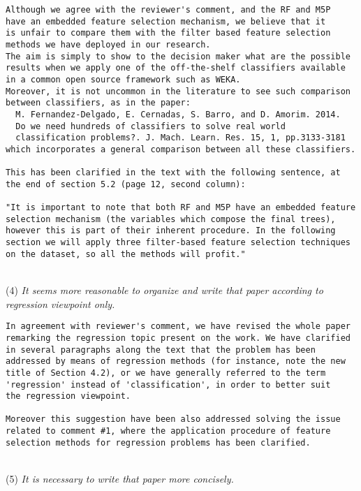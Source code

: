 \documentclass[preprint]{elsarticle}
\begin{document}
\begin{verbatim}
Although we agree with the reviewer's comment, and the RF and M5P 
have an embedded feature selection mechanism, we believe that it 
is unfair to compare them with the filter based feature selection 
methods we have deployed in our research. 
The aim is simply to show to the decision maker what are the possible 
results when we apply one of the off-the-shelf classifiers available 
in a common open source framework such as WEKA. 
Moreover, it is not uncommon in the literature to see such comparison 
between classifiers, as in the paper:
  M. Fernandez-Delgado, E. Cernadas, S. Barro, and D. Amorim. 2014. 
  Do we need hundreds of classifiers to solve real world 
  classification problems?. J. Mach. Learn. Res. 15, 1, pp.3133-3181
which incorporates a general comparison between all these classifiers.

This has been clarified in the text with the following sentence, at 
the end of section 5.2 (page 12, second column):

"It is important to note that both RF and M5P have an embedded feature 
selection mechanism (the variables which compose the final trees), 
however this is part of their inherent procedure. In the following 
section we will apply three filter-based feature selection techniques 
on the dataset, so all the methods will profit."
\end{verbatim}


~\\
\noindent (4) \emph{It seems more reasonable to organize and write that paper according to regression viewpoint only. } 

\begin{verbatim}
In agreement with reviewer's comment, we have revised the whole paper 
remarking the regression topic present on the work. We have clarified 
in several paragraphs along the text that the problem has been 
addressed by means of regression methods (for instance, note the new 
title of Section 4.2), or we have generally referred to the term 
'regression' instead of 'classification', in order to better suit 
the regression viewpoint.

Moreover this suggestion have been also addressed solving the issue 
related to comment #1, where the application procedure of feature 
selection methods for regression problems has been clarified. 
\end{verbatim}


~\\
\noindent (5) \emph{It is necessary to write that paper more concisely. } 
\end{document}
